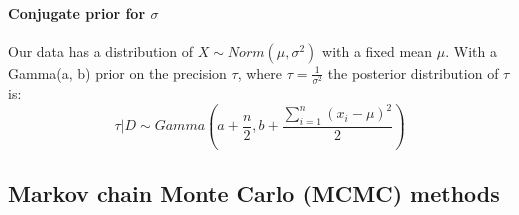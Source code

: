 \paragraph{Conjugate prior for $\sigma$}
Our data has a distribution of $X\sim Norm(\mu, \sigma^2)$ with a fixed mean $\mu$. With a Gamma(a, b) prior on the precision $\tau$, where $\tau = \frac{1}{\sigma^2}$ the posterior distribution of $\tau$ is:
\begin{equation*}
\tau|D\sim Gamma\left(a+\frac{n}{2}, b+\frac{\sum_{i=1}^{n}(x_i-\mu)^2}{2}\right)
\end{equation*}

\subsection{Markov chain Monte Carlo (MCMC) methods}
